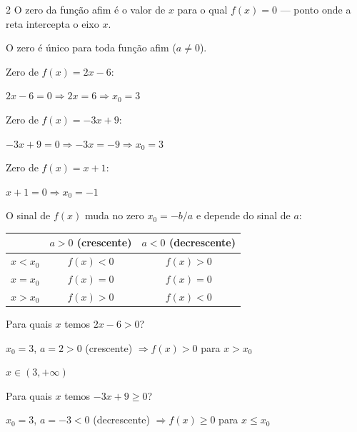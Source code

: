 \documentclass[12pt]{article}
\begin{document}
\begin{multicols}{2}
O zero da função afim é o valor de $x$ para o qual $f(x) = 0$ —
ponto onde a reta intercepta o eixo $x$.


O zero é único para toda função afim ($a \neq 0$).


Zero de $f(x) = 2x - 6$:\vspace{4pt}

$2x - 6 = 0 \Rightarrow 2x = 6 \Rightarrow \boxed{x_0 = 3}$\vspace{6pt}

Zero de $f(x) = -3x + 9$:\vspace{4pt}

$-3x + 9 = 0 \Rightarrow -3x = -9 \Rightarrow \boxed{x_0 = 3}$\vspace{6pt}

Zero de $f(x) = x + 1$:\vspace{4pt}

$x + 1 = 0 \Rightarrow \boxed{x_0 = -1}$


O sinal de $f(x)$ muda no zero $x_0 = -b/a$ e depende do sinal de $a$:

\vspace{0.3cm}
\begin{center}
\begin{tabular}{|c|c|c|}
\hline
 & $a > 0$ (crescente) & $a < 0$ (decrescente) \\
\hline
$x < x_0$ & $f(x) < 0$ & $f(x) > 0$ \\
$x = x_0$ & $f(x) = 0$ & $f(x) = 0$ \\
$x > x_0$ & $f(x) > 0$ & $f(x) < 0$ \\
\hline
\end{tabular}
\end{center}
\vspace{0.2cm}


Para quais $x$ temos $2x - 6 > 0$?

$x_0 = 3$, $a = 2 > 0$ (crescente) $\Rightarrow f(x) > 0$ para $x > x_0$

$\boxed{x \in (3, +\infty)}$\vspace{6pt}

Para quais $x$ temos $-3x + 9 \geq 0$?

$x_0 = 3$, $a = -3 < 0$ (decrescente) $\Rightarrow f(x) \geq 0$ para $x \leq x_0$


\end{multicols}
\end{document}
